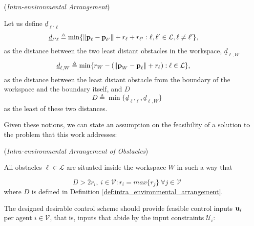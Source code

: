 \begin{bw_box}
\begin{definition} (\textit{Intra-environmental Arrangement})
\label{def:intra_environmental_arrangement}

  Let us define $\underline{d}_{\ell'\ell}$
  \begin{align}
    \underline{d}_{\ell'\ell} &\triangleq \min\{\| \bm{\mathbf{p}}_{\ell} - \bm{\mathbf{p}}_{\ell'}\| + r_{\ell} + r_{\ell'} :
      \ell,\ell' \in \mathcal{L}, \ell \neq \ell' \},
  \end{align}
  as the distance between the two least distant obstacles in the workspace,
  $\underline{d}_{\ell,W}$
  \begin{align}
    \underline{d}_{\ell,W} & \triangleq \min\{r_W - (\|\bm{\mathbf{p}}_W - \bm{\mathbf{p}}_{\ell}\| + r_{\ell}) : \ell \in \mathcal{L}\},
  \end{align}
  as the distance between the least distant obstacle from the boundary of the
  workspace and the boundary itself, and $D$
  \begin{equation}
    D \triangleq \min\{\underline{d}_{\ell'\ell}, \underline{d}_{\ell,W}\}
  \end{equation}
  as the least of these two distances.
\end{definition}
\end{bw_box}
Given these notions, we can state an assumption on the feasibility of a
solution to the problem that this work addresses:

\begin{gg_box}
  \begin{assumption}(\textit{Intra-environmental Arrangement of Obstacles})
  \label{ass:intra_environmental_arrangement}

    All obstacles $\ell \in \mathcal{L}$ are situated inside the workspace $W$
    in such a way that

  \begin{equation}
    D > 2 r_i,\ i \in \mathcal{V} : r_i = max\{r_j\}\ \forall j \in \mathcal{V}
  \label{eq:geometric_constraint}
  \end{equation}
  where $D$ is defined in Definition \eqref{def:intra_environmental_arrangement}.
\end{assumption}
\end{gg_box}

The designed desirable control scheme should provide feasible control
inputs $\bm{\mathbf{u}}_i$
per agent $i \in \mathcal{V}$, that is, inputs that abide by the input
constraints $\mathcal{U}_i$:

